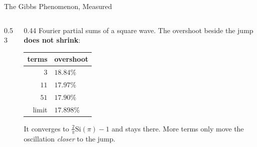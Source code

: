 \begin{frame}{The Gibbs Phenomenon, Measured}
\begin{columns}[T]
\begin{column}{0.53\textwidth}
\begin{center}
\begin{tikzpicture}
\end{tikzpicture}
\end{center}
\end{column}
\begin{column}{0.44\textwidth}
\small
Fourier partial sums of a square wave. The overshoot beside the jump \textbf{does not shrink}:
\medskip
\begin{center}\footnotesize
\begin{tabularx}{\linewidth}{@{}r >{\raggedleft\arraybackslash}X@{}}
\toprule
terms & overshoot \\
\midrule
$3$ & $18.84\%$ \\
$11$ & $17.97\%$ \\
$51$ & $17.90\%$ \\
\midrule
limit & $\mathbf{17.898\%}$ \\
\bottomrule
\end{tabularx}
\end{center}
\medskip
It converges to $\tfrac{2}{\pi}\mathrm{Si}(\pi)-1$ and stays there. More terms only move the oscillation \emph{closer} to the jump.
\end{column}
\end{columns}
\vspace{1mm}
\end{frame}

